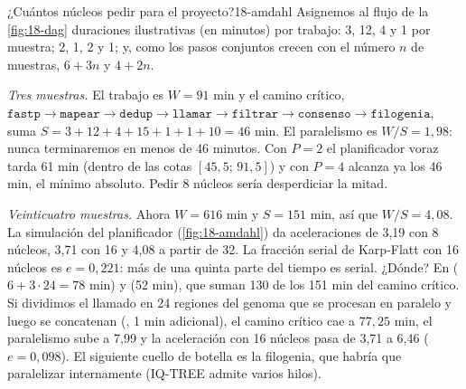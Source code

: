 \begin{ejemplo}{¿Cuántos núcleos pedir para el proyecto?}{18-amdahl}
Asignemos al flujo de la \cref{fig:18-dag} duraciones ilustrativas (en minutos) por trabajo:  3,  12,  4 y  1 por muestra;  2,  1,  2 y  1; y, como los pasos conjuntos crecen con el número $n$ de muestras,  $6+3n$ y  $4+2n$.

\emph{Tres muestras.} El trabajo es $W=91$ min y el camino crítico, $\texttt{fastp}\to\texttt{mapear}\to\texttt{dedup}\to\texttt{llamar}\to\texttt{filtrar}\to\texttt{consenso}\to\texttt{filogenia}$, suma $S=3+12+4+15+1+1+10=46$ min. El paralelismo es $W/S=1{,}98$: nunca terminaremos en menos de 46 minutos. Con $P=2$ el planificador voraz tarda 61 min (dentro de las cotas $[45{,}5;\,91{,}5]$) y con $P=4$ alcanza ya los 46 min, el mínimo absoluto. Pedir 8 núcleos sería desperdiciar la mitad.

\emph{Veinticuatro muestras.} Ahora $W=616$ min y $S=151$ min, así que $W/S=4{,}08$. La simulación del planificador (\cref{fig:18-amdahl}) da aceleraciones de 3,19 con 8 núcleos, 3,71 con 16 y 4,08 a partir de 32. La fracción serial de Karp-Flatt con 16 núcleos es $e=0{,}221$: más de una quinta parte del tiempo es serial. ¿Dónde? En  ($6+3\cdot24=78$ min) y  (52 min), que suman 130 de los 151 min del camino crítico. Si dividimos el llamado en 24 regiones del genoma que se procesan en paralelo y luego se concatenan (, 1 min adicional), el camino crítico cae a $77{,}25$ min, el paralelismo sube a 7,99 y la aceleración con 16 núcleos pasa de 3,71 a 6,46 ($e=0{,}098$). El siguiente cuello de botella es la filogenia, que habría que paralelizar internamente (IQ-TREE admite varios hilos).
\end{ejemplo}

